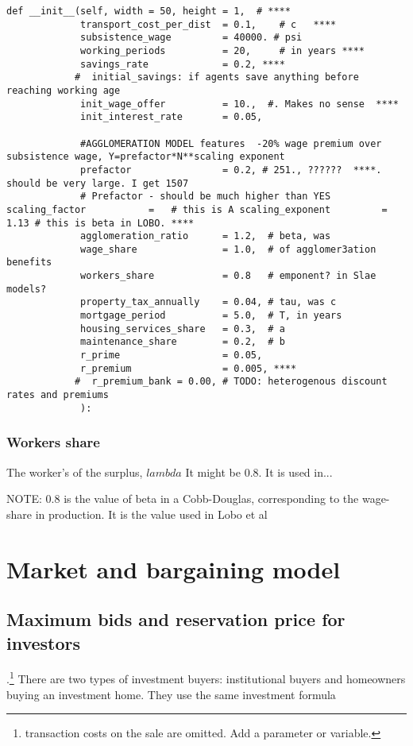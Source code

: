 \begin{lstlisting}
def __init__(self, width = 50, height = 1,  # ****
             transport_cost_per_dist  = 0.1,    # c   ****
             subsistence_wage         = 40000. # psi
             working_periods          = 20,     # in years ****
             savings_rate             = 0.2, ****
            #  initial_savings: if agents save anything before reaching working age
             init_wage_offer          = 10.,  #. Makes no sense  ****
             init_interest_rate       = 0.05,

             #AGGLOMERATION MODEL features  -20% wage premium over subsistence wage, Y=prefactor*N**scaling exponent
             prefactor                = 0.2, # 251., ??????  ****. should be very large. I get 1507 
             # Prefactor - should be much higher than YES scaling_factor           =   # this is A scaling_exponent         =  1.13 # this is beta in LOBO. ****
             agglomeration_ratio      = 1.2,  # beta, was 
             wage_share               = 1.0,  # of agglomer3ation benefits
             workers_share            = 0.8   # emponent? in Slae models?
             property_tax_annually    = 0.04, # tau, was c
             mortgage_period          = 5.0,  # T, in years
             housing_services_share   = 0.3,  # a
             maintenance_share        = 0.2,  # b
             r_prime                  = 0.05,
             r_premium                = 0.005, ****
            #  r_premium_bank = 0.00, # TODO: heterogenous discount rates and premiums
             ):
\end{lstlisting}

\subsection{Workers share}
The worker's of the surplus, $lambda$ It might be 0.8. It is used in...

NOTE: 0.8 is the value of beta in a Cobb-Douglas, corresponding to the wage-share in production. It is the value used in Lobo et al



\chapter{Market and bargaining model}


\section{Maximum bids and reservation price for investors }.\footnote{transaction costs on the sale are omitted. Add a parameter or variable.}
There are two types of investment buyers: institutional buyers and homeowners buying an investment home. They use the same investment formula

